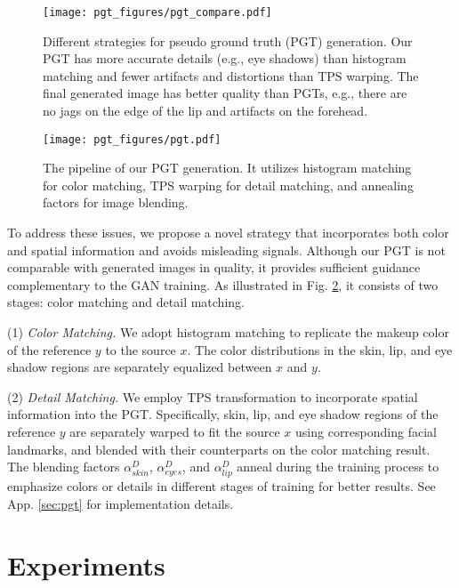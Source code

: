 \begin{figure}[t]
    \setlength{\belowcaptionskip}{-0.2cm}
    \centering
    \texttt{[image: pgt\_figures/pgt\_compare.pdf]}
    \caption{Different strategies for pseudo ground truth (PGT) generation. Our PGT has more accurate details (e.g., eye shadows) than histogram matching and fewer artifacts and distortions than TPS warping. The final generated image has better quality than PGTs, e.g., there are no jags on the edge of the lip and artifacts on the forehead.}
    \label{fig:PGT_Diff_strat}
\end{figure}

\begin{figure}[!htbp]
    \setlength{\belowcaptionskip}{-0.2cm}
    \centering
    \texttt{[image: pgt\_figures/pgt.pdf]}
    \caption{The pipeline of our PGT generation. It utilizes histogram matching for color matching, TPS warping for detail matching, and annealing factors for image blending.}
    \label{fig:PGT}
\end{figure}
To address these issues, we propose a novel strategy that incorporates both color and spatial information and avoids misleading signals. Although our PGT is not comparable with generated images in quality, it provides sufficient guidance complementary to the GAN training. As illustrated in Fig. \ref{fig:PGT}, it consists of two stages: color matching and detail matching.

(1) \textit{Color Matching.}
We adopt histogram matching \cite{BeautyGAN} to replicate the makeup color of the reference $y$ to the source $x$. The color distributions in the skin, lip, and eye shadow regions are separately equalized between $x$ and $y$. 

(2) \textit{Detail Matching.}
We employ TPS transformation to incorporate spatial information into the PGT. Specifically, skin, lip, and eye shadow regions of the reference $y$ are separately warped to fit the source $x$ using corresponding facial landmarks, and blended with their counterparts on the color matching result. The blending factors $\alpha^D_{skin}$, $\alpha^D_{eyes}$, and $\alpha^D_{lip}$ anneal during the training process to emphasize colors or details in different stages of training for better results. See App. %
\ref{sec:pgt} 
for implementation details. 

\section{Experiments}
